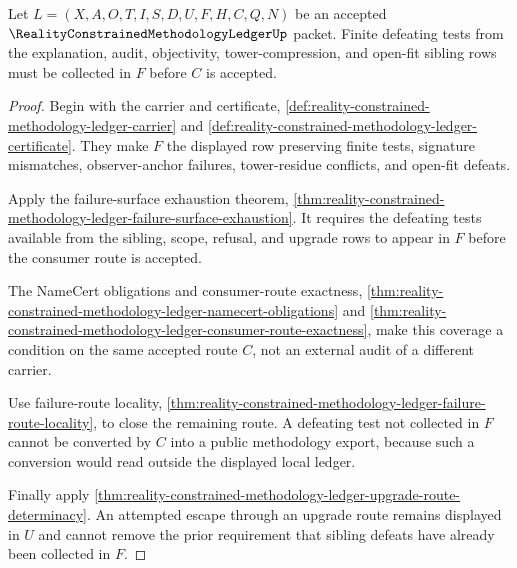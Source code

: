 \begin{theorem}
\label{thm:reality-constrained-methodology-ledger-sibling-failure-coverage}
Let $L=(X,A,O,T,I,S,D,U,F,H,C,Q,N)$ be an accepted
$\RealityConstrainedMethodologyLedgerUp$ packet. Finite defeating tests from the
explanation, audit, objectivity, tower-compression, and open-fit sibling rows
must be collected in $F$ before $C$ is accepted.
\end{theorem}
\begin{proof}
Begin with the carrier and certificate,
\autoref{def:reality-constrained-methodology-ledger-carrier} and
\autoref{def:reality-constrained-methodology-ledger-certificate}. They make $F$
the displayed row preserving finite tests, signature mismatches,
observer-anchor failures, tower-residue conflicts, and open-fit defeats.

Apply the failure-surface exhaustion theorem,
\autoref{thm:reality-constrained-methodology-ledger-failure-surface-exhaustion}.
It requires the defeating tests available from the sibling, scope, refusal, and
upgrade rows to appear in $F$ before the consumer route is accepted.

The NameCert obligations and consumer-route exactness,
\autoref{thm:reality-constrained-methodology-ledger-namecert-obligations} and
\autoref{thm:reality-constrained-methodology-ledger-consumer-route-exactness},
make this coverage a condition on the same accepted route $C$, not an external
audit of a different carrier.

Use failure-route locality,
\autoref{thm:reality-constrained-methodology-ledger-failure-route-locality}, to
close the remaining route. A defeating test not collected in $F$ cannot be
converted by $C$ into a public methodology export, because such a conversion
would read outside the displayed local ledger.

Finally apply
\autoref{thm:reality-constrained-methodology-ledger-upgrade-route-determinacy}.
An attempted escape through an upgrade route remains displayed in $U$ and cannot
remove the prior requirement that sibling defeats have already been collected in
$F$.
\end{proof}

